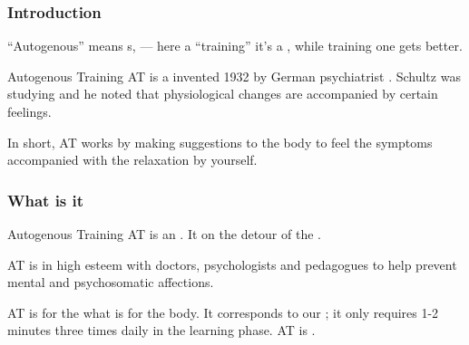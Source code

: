 \begin{frame}
\frametitle{Introduction}

``Autogenous'' means s, --- here a  ``training'' it's a , while training one gets better.


Autogenous Training AT is a  invented 1932 by  German psychiatrist . Schultz was studying  and he noted that physiological changes are accompanied by certain feelings.

In short, AT works by making suggestions to the body to feel the symptoms accompanied with the relaxation by yourself.
\end{frame}
\begin{frame}
\frametitle{What is it}

Autogenous Training AT is an . It  on the detour of the . 

AT is in high esteem with doctors, psychologists and pedagogues to help prevent mental and psychosomatic affections.

AT is for the  what  is for the body. It corresponds to our ; it only requires 1-2 minutes three times daily in the learning phase. AT is .  
\end{frame}
